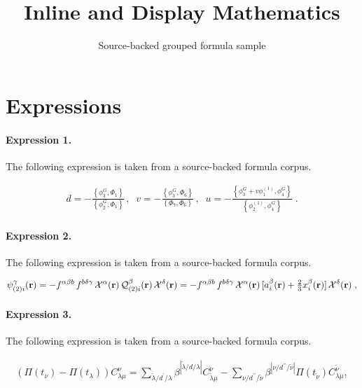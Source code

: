 \documentclass[11pt]{article}
\title{Inline and Display Mathematics}
\author{Source-backed grouped formula sample}
\date{}
\begin{document}
\maketitle
\section{Expressions}
\paragraph{Expression 1.} The following expression is taken from a source-backed formula corpus.

\begin{align*}d=-\frac{\left\{ \phi _{3}^{G},\Phi _{1}\right\} }{\left\{ \phi_{2}^{G},\Phi _{1}\right\} }\,,\;\;v=-\frac{\left\{ \phi _{3}^{G},\Phi_{6}\right\} }{\left\{ \Phi _{7},\Phi _{6}\right\} }\,,\;\;u=-\frac{\left\{\phi _{3}^{G}+v\phi _{1}^{\left( 1\right) },\phi _{4}^{G}\right\} }{\left\{\phi _{2}^{(1)},\phi _{4}^{G}\right\} }\;.\end{align*}

\paragraph{Expression 2.} The following expression is taken from a source-backed formula corpus.

\begin{align*}\psi^{\gamma}_{(2)i}({\bf{r}})=-f^{\alpha\beta b}\,f^{b\delta\gamma}\,{\cal{X}}^\alpha({\bf{r}})\,{\cal{Q}}_{(2)i}^{\beta}({\bf{r}})\,{\cal{X}}^\delta({\bf{r}})=-f^{\alpha\beta b}\,f^{b\delta\gamma}\,{\cal{X}}^\alpha({\bf{r}})\,[a_i^\beta ({\bf{r}})+{\textstyle\frac{2}{3}}x_i^\beta({\bf{r}})]\,{\cal{X}}^\delta({\bf{r}})\;,\end{align*}

\paragraph{Expression 3.} The following expression is taken from a source-backed formula corpus.

\begin{align*}\left( \Pi (t_{\nu })-\Pi (t_{\lambda })\right) C_{\lambda \mu }^{\nu}=\sum_{\tilde{\lambda}/d^{\prime }/\lambda }\beta ^{|\tilde{\lambda}/d/\lambda |}C_{\tilde{\lambda}\mu }^{\nu }-\sum_{\nu /d^{\prime \prime }/\tilde{\nu}}\beta ^{|\nu /d^{\prime \prime }/\tilde{\nu}|}\Pi (t_{\tilde{\nu}})C_{\lambda \mu }^{\tilde{\nu}}, \end{align*}
\end{document}
